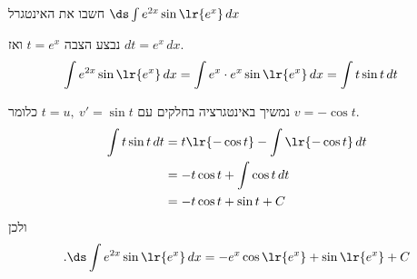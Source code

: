 חשבו את האינטגרל
$\ds \int e^{2x}\sin\lr{e^x}\,dx$
\begin{solbox}
נבצע הצבה $t=e^x$ ואז $dt=e^x\,dx$.
\begin{align*}
\int e^{2x}\sin\lr{e^x}\,dx
&=\int e^x\cdot e^x\sin\lr{e^x}\,dx
=\int t\sin t\,dt
\end{align*}

נמשיך באינטגרציה בחלקים עם
$t=u,\ v'=\sin t$
כלומר
$v=-\cos t$.
\begin{align*}
\int t\sin t\,dt
&=t\lr{-\cos t}-\int \lr{-\cos t}\,dt\\
&=-t\cos t+\int \cos t\,dt\\
&=-t\cos t+\sin t+C
\end{align*}
ולכן $$.\ds \int e^{2x}\sin\lr{e^x}\,dx=-e^x\cos\lr{e^x}+\sin\lr{e^x}+C$$
\end{solbox}
